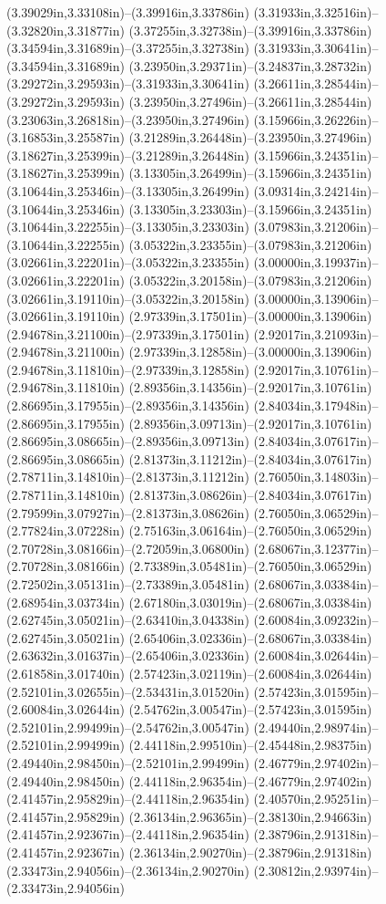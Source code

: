 (3.39029in,3.33108in)--(3.39916in,3.33786in) (3.31933in,3.32516in)--(3.32820in,3.31877in) (3.37255in,3.32738in)--(3.39916in,3.33786in) (3.34594in,3.31689in)--(3.37255in,3.32738in) (3.31933in,3.30641in)--(3.34594in,3.31689in) (3.23950in,3.29371in)--(3.24837in,3.28732in) (3.29272in,3.29593in)--(3.31933in,3.30641in) (3.26611in,3.28544in)--(3.29272in,3.29593in) (3.23950in,3.27496in)--(3.26611in,3.28544in) (3.23063in,3.26818in)--(3.23950in,3.27496in) (3.15966in,3.26226in)--(3.16853in,3.25587in) (3.21289in,3.26448in)--(3.23950in,3.27496in) (3.18627in,3.25399in)--(3.21289in,3.26448in) (3.15966in,3.24351in)--(3.18627in,3.25399in) (3.13305in,3.26499in)--(3.15966in,3.24351in) (3.10644in,3.25346in)--(3.13305in,3.26499in) (3.09314in,3.24214in)--(3.10644in,3.25346in) (3.13305in,3.23303in)--(3.15966in,3.24351in) (3.10644in,3.22255in)--(3.13305in,3.23303in) (3.07983in,3.21206in)--(3.10644in,3.22255in) (3.05322in,3.23355in)--(3.07983in,3.21206in) (3.02661in,3.22201in)--(3.05322in,3.23355in) (3.00000in,3.19937in)--(3.02661in,3.22201in) (3.05322in,3.20158in)--(3.07983in,3.21206in) (3.02661in,3.19110in)--(3.05322in,3.20158in) (3.00000in,3.13906in)--(3.02661in,3.19110in) (2.97339in,3.17501in)--(3.00000in,3.13906in) (2.94678in,3.21100in)--(2.97339in,3.17501in) (2.92017in,3.21093in)--(2.94678in,3.21100in) (2.97339in,3.12858in)--(3.00000in,3.13906in) (2.94678in,3.11810in)--(2.97339in,3.12858in) (2.92017in,3.10761in)--(2.94678in,3.11810in) (2.89356in,3.14356in)--(2.92017in,3.10761in) (2.86695in,3.17955in)--(2.89356in,3.14356in) (2.84034in,3.17948in)--(2.86695in,3.17955in) (2.89356in,3.09713in)--(2.92017in,3.10761in) (2.86695in,3.08665in)--(2.89356in,3.09713in) (2.84034in,3.07617in)--(2.86695in,3.08665in) (2.81373in,3.11212in)--(2.84034in,3.07617in) (2.78711in,3.14810in)--(2.81373in,3.11212in) (2.76050in,3.14803in)--(2.78711in,3.14810in) (2.81373in,3.08626in)--(2.84034in,3.07617in) (2.79599in,3.07927in)--(2.81373in,3.08626in) (2.76050in,3.06529in)--(2.77824in,3.07228in) (2.75163in,3.06164in)--(2.76050in,3.06529in) (2.70728in,3.08166in)--(2.72059in,3.06800in) (2.68067in,3.12377in)--(2.70728in,3.08166in) (2.73389in,3.05481in)--(2.76050in,3.06529in) (2.72502in,3.05131in)--(2.73389in,3.05481in) (2.68067in,3.03384in)--(2.68954in,3.03734in) (2.67180in,3.03019in)--(2.68067in,3.03384in) (2.62745in,3.05021in)--(2.63410in,3.04338in) (2.60084in,3.09232in)--(2.62745in,3.05021in) (2.65406in,3.02336in)--(2.68067in,3.03384in) (2.63632in,3.01637in)--(2.65406in,3.02336in) (2.60084in,3.02644in)--(2.61858in,3.01740in) (2.57423in,3.02119in)--(2.60084in,3.02644in) (2.52101in,3.02655in)--(2.53431in,3.01520in) (2.57423in,3.01595in)--(2.60084in,3.02644in) (2.54762in,3.00547in)--(2.57423in,3.01595in) (2.52101in,2.99499in)--(2.54762in,3.00547in) (2.49440in,2.98974in)--(2.52101in,2.99499in) (2.44118in,2.99510in)--(2.45448in,2.98375in) (2.49440in,2.98450in)--(2.52101in,2.99499in) (2.46779in,2.97402in)--(2.49440in,2.98450in) (2.44118in,2.96354in)--(2.46779in,2.97402in) (2.41457in,2.95829in)--(2.44118in,2.96354in) (2.40570in,2.95251in)--(2.41457in,2.95829in) (2.36134in,2.96365in)--(2.38130in,2.94663in) (2.41457in,2.92367in)--(2.44118in,2.96354in) (2.38796in,2.91318in)--(2.41457in,2.92367in) (2.36134in,2.90270in)--(2.38796in,2.91318in) (2.33473in,2.94056in)--(2.36134in,2.90270in) (2.30812in,2.93974in)--(2.33473in,2.94056in) 